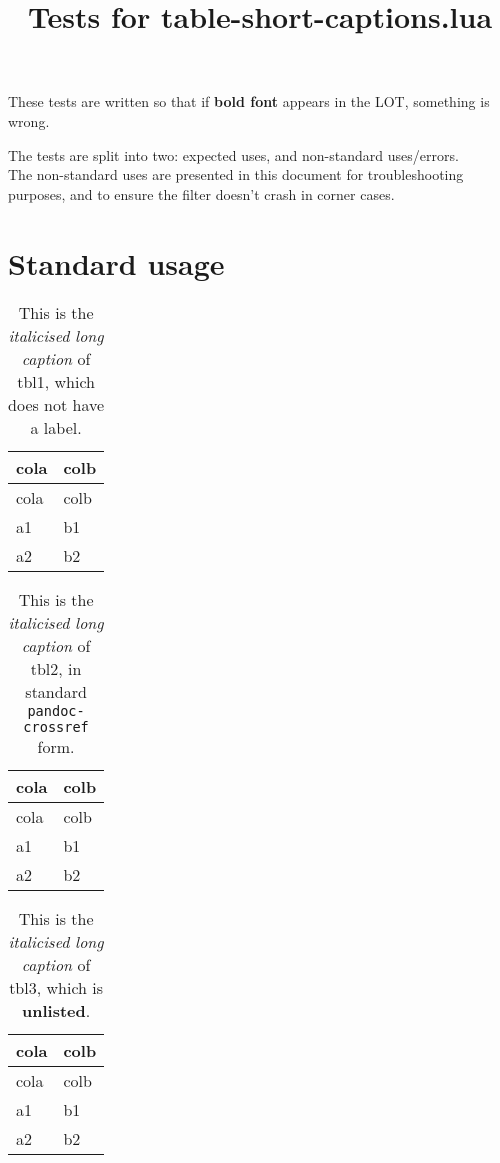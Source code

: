 \documentclass[
]{article}
\title{Tests for table-short-captions.lua}
\date{}
\begin{document}
\maketitle

\listoftables
These tests are written so that if \textbf{bold font} appears in the
LOT, something is wrong.

The tests are split into two: expected uses, and non-standard
uses/errors.\\
The non-standard uses are presented in this document for troubleshooting
purposes, and to ensure the filter doesn't crash in corner cases.

\hypertarget{standard-usage}{%
\section{Standard usage}\label{standard-usage}}

\begin{longtable}[]{@{}ll@{}}
\caption{This is the \emph{italicised long caption} of tbl1, which does
not have a label.}\tabularnewline
\toprule
cola & colb\tabularnewline
\midrule
\endfirsthead
\toprule
cola & colb\tabularnewline
\midrule
\endhead
a1 & b1\tabularnewline
a2 & b2\tabularnewline
\bottomrule
\end{longtable}

\hypertarget{tbl:tbl-label2}{}
\begin{longtable}[]{@{}ll@{}}
\caption{\label{tbl:tbl-label2}This is the \emph{italicised long
caption} of tbl2, in standard \texttt{pandoc-crossref}
form.}\tabularnewline
\toprule
cola & colb\tabularnewline
\midrule
\endfirsthead
\toprule
cola & colb\tabularnewline
\midrule
\endhead
a1 & b1\tabularnewline
a2 & b2\tabularnewline
\bottomrule
\end{longtable}

\def\pandoctableshortcapt{}  %

\hypertarget{tbl:tbl-label3}{}
\begin{longtable}[]{@{}ll@{}}
\caption{\label{tbl:tbl-label3}This is the \emph{italicised long
caption} of tbl3, which is \textbf{unlisted}.}\tabularnewline
\toprule
cola & colb\tabularnewline
\midrule
\endfirsthead
\toprule
cola & colb\tabularnewline
\midrule
\endhead
a1 & b1\tabularnewline
a2 & b2\tabularnewline
\bottomrule
\end{longtable}

\undef\pandoctableshortcapt

\def\pandoctableshortcapt{Table 4 \emph{short} capt.}
\end{document}
